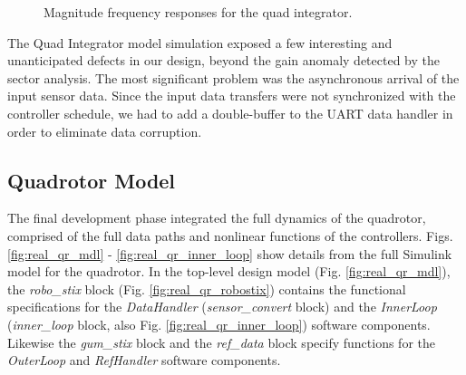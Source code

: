 \begin{figure}[htb]
\centering
{}
{}
\caption{Magnitude frequency responses for the quad integrator.}
\label{fig:mags}
\end{figure}

The Quad Integrator model simulation exposed a few interesting and
unanticipated defects in our design, beyond the gain anomaly detected by the sector analysis.  The most significant problem was the asynchronous arrival of the input sensor data.  Since the input data transfers were not synchronized with the controller schedule, we had to add a double-buffer to the UART data handler in order to eliminate data corruption.

\subsection{Quadrotor Model}

The final development phase integrated the full dynamics of the quadrotor,
comprised of the full data paths and nonlinear functions of the controllers.
Figs. \ref{fig:real_qr_mdl} - \ref{fig:real_qr_inner_loop} show details from the full Simulink model for the quadrotor.   
In the top-level design model (Fig. \ref{fig:real_qr_mdl}), the \emph{robo\_stix} block (Fig. \ref{fig:real_qr_robostix}) contains the functional specifications for the \emph{DataHandler} (\emph{sensor\_convert} block) and the \emph{InnerLoop} (\emph{inner\_loop} block, also Fig. \ref{fig:real_qr_inner_loop}) software components.  Likewise the \emph{gum\_stix} block and the \emph{ref\_data} block specify functions for the \emph{OuterLoop} and \emph{RefHandler} software components. 

